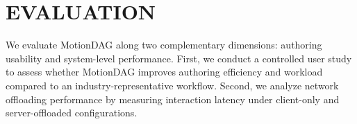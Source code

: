 \section{EVALUATION}\label{sec:evaluation}
We evaluate MotionDAG along two complementary dimensions: authoring usability and system-level performance. 
First, we conduct a controlled user study to assess whether MotionDAG improves authoring efficiency and workload compared to an industry-representative workflow. Second, we analyze network offloading performance by measuring interaction latency under client-only and server-offloaded configurations.




